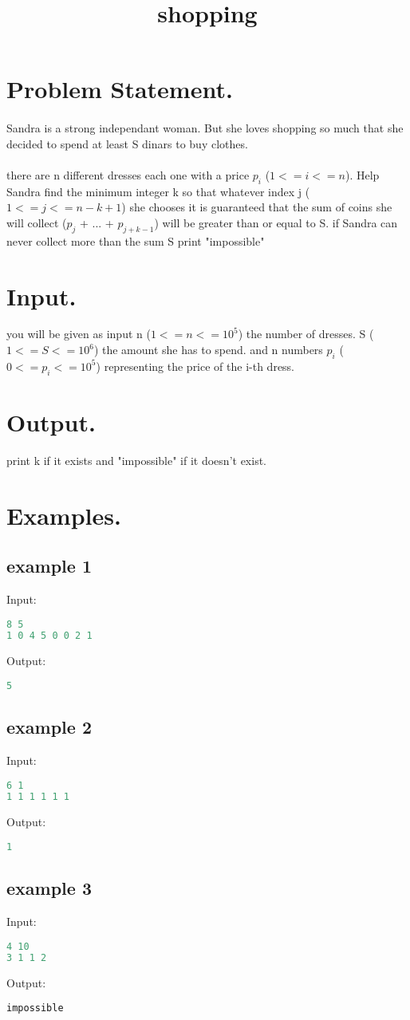 \documentclass[8pt]{article}
\begin{document}
\title{shopping}
 \date{}
\maketitle

\section{Problem Statement.}
\paragraph{}
Sandra is a strong independant woman. But she loves shopping so much that she decided to spend at least S dinars to buy clothes.
\paragraph{}
there are n different dresses each one with a price $p_i$ ($1<=i<=n$).
Help Sandra find the minimum integer k so that whatever index j ($1<=j<=n-k+1$) she chooses it is guaranteed 
that the sum of coins she will collect ($p_j$ + ... + $p_{j+k-1}$) will be greater than or equal to S.
if Sandra can never collect more than the sum S print "impossible"
\section{Input.}
you will be given as input n ($1<=n<=10^5$) the number of dresses. S ($1<=S<=10^6$) the amount she has to spend.
and n numbers $p_i$ ($0<=p_i<=10^5$) representing the price of the i-th dress.
\section{Output.}
print k if it exists and "impossible" if it doesn't exist.

\section{Examples.}
\subsection{example 1}
Input:
\begin{lstlisting}[language=Python]
8 5
1 0 4 5 0 0 2 1
\end{lstlisting}
Output:
\begin{lstlisting}[language=Python]
5
\end{lstlisting}
\subsection{example 2}
Input:
\begin{lstlisting}[language=Python]
6 1
1 1 1 1 1 1
\end{lstlisting}
Output:
\begin{lstlisting}[language=Python]
1
\end{lstlisting}
\subsection{example 3}
Input:
\begin{lstlisting}[language=Python]
4 10
3 1 1 2
\end{lstlisting}
Output:
\begin{lstlisting}[language=Python]
impossible
\end{lstlisting}
\end{document}
